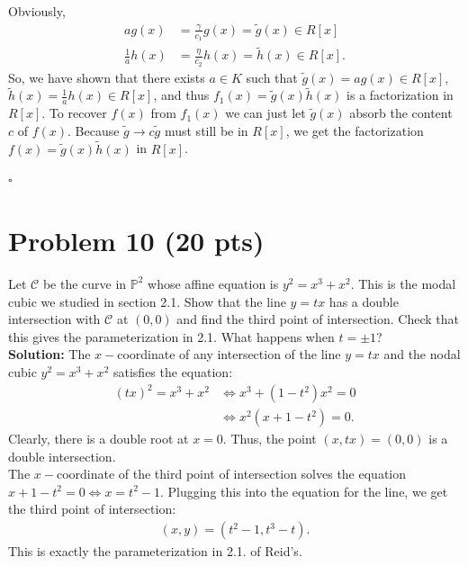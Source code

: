 \documentclass[12pt]{article}
\newcommand{\nn}{\nonumber}
\newcommand{\f}[2]{\frac{#1}{#2}}
\begin{document}
Obviously, 
\begin{align*}
ag(x) &= \f{\gamma}{c_1}g(x) = \tilde{g}(x) \in R[x]\nn\\
\f{1}{a}h(x) &= \f{\eta}{c_2}h(x) = \tilde{h}(x) \in R[x].
\end{align*}
So, we have shown that there exists $a \in K$ such that $\tilde{g}(x) = ag(x) \in R[x]$, $\tilde{h}(x) = \f{1}{a}h(x) \in R[x]$, and thus $f_1(x) = \tilde{g}(x)\tilde{h}(x)$ is a factorization in $R[x]$. To recover $f(x)$ from $f_1(x)$ we can just let $\tilde{g}(x)$ absorb the content $c$ of $f(x)$. Because $\tilde{g} \to c\tilde{g}$ must still be in $R[x]$, we get the factorization $f(x) = \tilde{g}(x)\tilde{h}(x)$ in $R[x]$.   

\hfill$\square$ 




















\newpage


\section*{Problem 10 \small{(20 pts)}}

Let $\mathcal{C}$ be the curve in $\mathbb{P}^2$ whose affine equation is $y^2 = x^3 + x^2$. This is the modal cubic we studied in section 2.1. Show that the line $y=tx$ has a double intersection with $\mathcal{C}$ at $(0,0)$ and find the third point of intersection. Check that this gives the parameterization in 2.1. What happens when $t = \pm 1$? \\



\noindent \textbf{Solution:} The $x-$coordinate of any intersection of the line $y = tx$ and the nodal cubic $y^2 = x^3 + x^2$ satisfies the equation:
\begin{align}\label{eq4}
(tx)^2 = x^3 + x^2 &\iff x^3 + (1-t^2)x^2 = 0 \nn\\
&\iff x^2(x + 1 -t^2) = 0.
\end{align}
Clearly, there is a double root at $x=0$. Thus, the point $(x,tx) = (0,0)$ is a double intersection. \\

\noindent The $x-$coordinate of the third point of intersection solves the equation $x + 1 - t^2 = 0 \iff x = t^2 - 1$. Plugging this into the equation for the line, we get the third point of intersection:
\begin{align*}
(x,y) = (t^2 - 1, t^3 - t).
\end{align*}
This is exactly the parameterization in 2.1. of Reid's.\\
\end{document}
